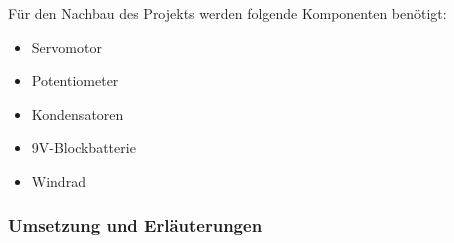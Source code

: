 Für den Nachbau des Projekts werden folgende Komponenten benötigt:
\begin{itemize}
\item{Servomotor}
\item{Potentiometer}
\item{Kondensatoren}
\item{9V-Blockbatterie}
\item{Windrad}
\end{itemize}

\subsubsection{Umsetzung und Erläuterungen}



